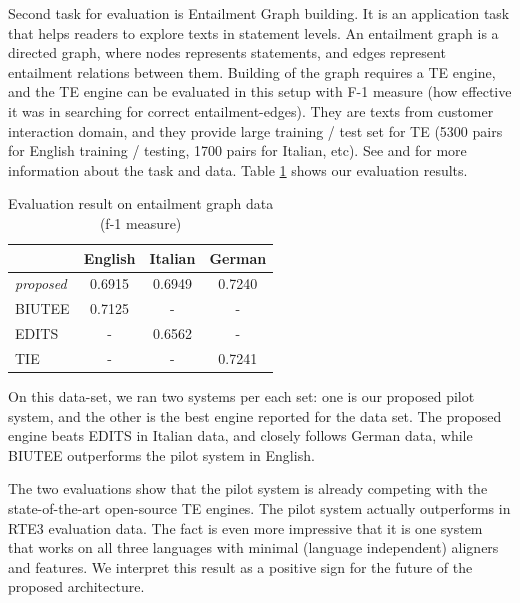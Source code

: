 \documentclass[11pt,letterpaper]{article}
\begin{document}
Second task for evaluation is Entailment Graph building. It is an
application task that helps readers to explore texts in statement
levels. An entailment graph is a directed graph, where nodes
represents statements, and edges represent entailment relations
between them. Building of the graph requires a TE engine, and the TE
engine can be evaluated in this setup with F-1 measure (how effective
it was in searching for correct entailment-edges). They are texts from
customer interaction domain, and they provide large training / test
set for TE (5300 pairs for English training / testing, 1700 pairs for
Italian, etc). See \cite{} and \cite{} for more information about the
task and data.
Table \ref{table:egraph} shows our evaluation results.      

\begin{table}[t!]
\centering
\small
\begin{tabular}{l|ccc}
              &   English    &   Italian   &  German  \\
\hline
{\em proposed}&   0.6915     &   0.6949    &   0.7240  \\
BIUTEE        &   0.7125     &     -       &     -     \\
EDITS         &      -       &   0.6562    &     -     \\
TIE           &      -       &     -       &   0.7241  \\ 
\end{tabular}
\caption{Evaluation result on entailment graph data (f-1 measure)}
\label{table:egraph}
\end{table}

On this data-set, we ran two systems per each set: one is our proposed 
pilot system, and the other is the best engine reported for the data
set. The proposed engine beats EDITS in Italian data, and closely
follows German data, while BIUTEE outperforms the pilot system in
English.    

The two evaluations show that the pilot system is already competing
with the state-of-the-art open-source TE engines. The pilot system
actually outperforms in RTE3 evaluation data. The fact is even more
impressive that it is one system that works on all three languages
with minimal (language independent) aligners and features. We
interpret this result as a positive sign for the future of the
proposed architecture.     
\end{document}
